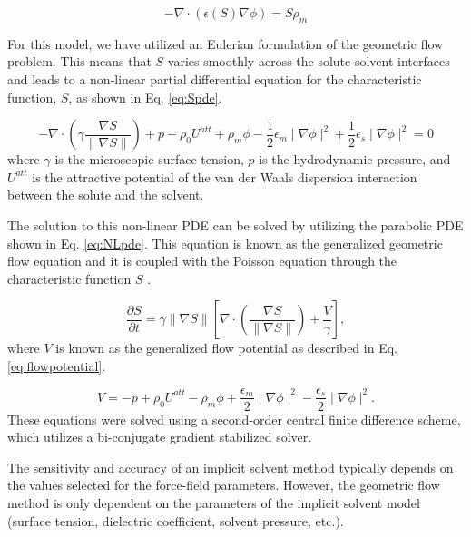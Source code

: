 \documentclass[11pt,titlepage]{article}
\begin{document}
\begin{equation}\label{eq:GFpoisson}
-\nabla \cdot\left(\epsilon\left(S\right)\nabla\phi\right)=S\rho_m
\end{equation}

For this model, we have utilized an Eulerian formulation of the geometric flow problem. This means that $S$ varies smoothly across the solute-solvent interfaces and leads to a non-linear partial differential equation for the characteristic function, $S$, as shown in Eq. \ref{eq:Spde}.

\begin{equation}\label{eq:Spde}
-\nabla\cdot\left(\gamma\frac{\nabla S}{\parallel\nabla S\parallel}\right)+p-\rho_0U^{att}+\rho_m\phi - \frac{1}{2}\epsilon_m\mid\nabla\phi\mid^2+\frac{1}{2}\epsilon_s\mid\nabla\phi\mid^2=0
\end{equation}
where $\gamma$ is the microscopic surface tension, $p$ is the hydrodynamic pressure, and $U^{att}$ is the attractive potential of the van der Waals dispersion interaction between the solute and the solvent.

The solution to this non-linear PDE can be solved by utilizing the parabolic PDE shown in Eq. \ref{eq:NLpde}. This equation is known as the generalized geometric flow equation and it is coupled with the Poisson equation through the characteristic function $S$ \cite{chen2010}.

\begin{equation}\label{eq:NLpde}
\frac{\partial S}{\partial t}=\gamma\parallel\nabla S\parallel\left[\nabla\cdot\left(\frac{\nabla S}{\parallel\nabla S\parallel}\right)+\frac{V}{\gamma}\right],
\end{equation}
where $V$ is known as the generalized flow potential as described in Eq. \ref{eq:flowpotential}. 

\begin{equation}\label{eq:flowpotential}
V=-p+\rho_0U^{att}-\rho_m\phi+\frac{\epsilon_m}{2}\mid\nabla\phi\mid^2-\frac{\epsilon_s}{2}\mid\nabla\phi\mid^2.
\end{equation}
%
These equations were solved using a second-order central finite difference scheme, which utilizes a bi-conjugate gradient stabilized solver.

The sensitivity and accuracy of an implicit solvent method typically depends on the values selected for the force-field parameters. However, the geometric flow method is only dependent on the parameters of the implicit solvent model (surface tension, dielectric coefficient, solvent pressure, etc.).
\end{document}

